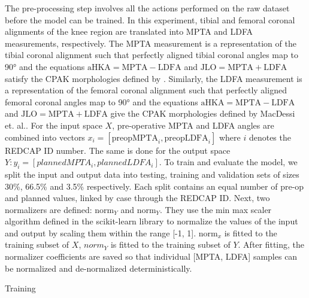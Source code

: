 \documentclass{article}
\begin{document}
	The pre-processing step involves all the actions performed on the raw dataset before the model can be trained.
In this experiment, tibial and femoral coronal alignments of the knee region are translated into MPTA and LDFA measurements, respectively.
The MPTA measurement is a representation of the tibial coronal alignment such that perfectly aligned tibial coronal angles map to 90° 
and the equations $\text{aHKA}=\text{MPTA}-\text{LDFA}$ and $\text{JLO}=\text{MPTA}+\text{LDFA}$ satisfy the CPAK morphologies defined by \cite{cpak-paper}.
Similarly, the LDFA measurement is a representation of the femoral coronal alignment such that perfectly aligned femoral coronal angles map to 90°
and the equations $\text{aHKA}=\text{MPTA}-\text{LDFA}$ and $\text{JLO}=\text{MPTA}+\text{LDFA}$ give the CPAK morphologies defined by MacDessi et. al.\cite{cpak-paper}.
For the input space $X$, pre-operative MPTA and LDFA angles are combined into vectors $x_i=[\text{preopMPTA}_i, \text{preopLDFA}_i]$
where $i$ denotes the REDCAP ID number. The same is done for the output space $Y: y_i=[plannedMPTA_i, plannedLDFA_i]$.
To train and evaluate the model, we split the input and output data into testing, training and validation sets of sizes 30\%, 66.5\% and 3.5\% respectively.
Each split contains an equal number of pre-op and planned values, linked by case through the REDCAP ID.
	Next, two normalizers are defined: $\text{norm}_Y$ and $\text{norm}_Y$.
They use the min max scaler algorithm defined in the scikit-learn library \cite{scikit-learn} to normalize the values of the input and output
by scaling them within the range [-1, 1].
$\text{norm}_x$ is fitted to the training subset of $X$, $norm_Y$ is fitted to the training subset of $Y$.
After fitting, the normalizer coefficients are saved so that individual [MPTA, LDFA] samples can be normalized and de-normalized deterministically.

Training
	
\end{document}
